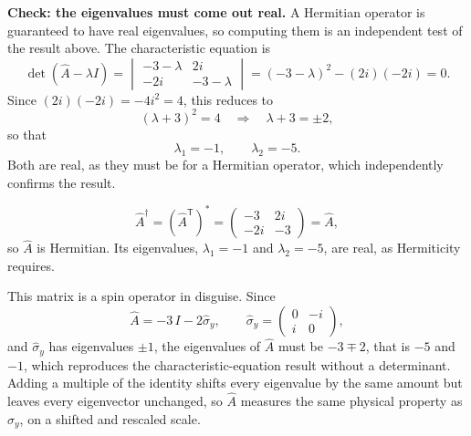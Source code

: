 \documentclass[12pt]{article}
\begin{document}
\begin{solutionbox}
\textbf{Check: the eigenvalues must come out real.} A Hermitian operator is guaranteed to have real eigenvalues, so computing them is an independent test of the result above. The characteristic equation is
\[
    \det\left(\hat{A}-\lambda I\right)
    =\begin{vmatrix} -3-\lambda & 2i \\ -2i & -3-\lambda \end{vmatrix}
    =(-3-\lambda)^{2}-(2i)(-2i)=0 .
\]
Since $(2i)(-2i)=-4i^{2}=4$, this reduces to
\[
    (\lambda+3)^{2}=4 \quad\Longrightarrow\quad \lambda+3=\pm 2 ,
\]
so that
\[
    \lambda_{1}=-1, \qquad \lambda_{2}=-5 .
\]
Both are real, as they must be for a Hermitian operator, which independently confirms the result.
\end{solutionbox}

\begin{answerbox}
\[
    \hat{A}^{\dagger}=\left(\hat{A}^{\mathsf{T}}\right)^{*}
    =\begin{pmatrix} -3 & 2i \\ -2i & -3\end{pmatrix}=\hat{A},
\]
so $\hat{A}$ is Hermitian. Its eigenvalues, $\lambda_{1}=-1$ and $\lambda_{2}=-5$, are real, as Hermiticity requires.
\end{answerbox}

\begin{insightbox}
This matrix is a spin operator in disguise. Since
\[
    \hat{A}=-3\,I-2\hat{\sigma}_{y},
    \qquad
    \hat{\sigma}_{y}=\begin{pmatrix} 0 & -i \\ i & 0\end{pmatrix},
\]
and $\hat{\sigma}_{y}$ has eigenvalues $\pm 1$, the eigenvalues of $\hat{A}$ must be $-3\mp 2$, that is $-5$ and $-1$, which reproduces the characteristic-equation result without a determinant. Adding a multiple of the identity shifts every eigenvalue by the same amount but leaves every eigenvector unchanged, so $\hat{A}$ measures the same physical property as $\hat{\sigma}_{y}$, on a shifted and rescaled scale.
\end{insightbox}
\fi

\newpage
\end{document}
